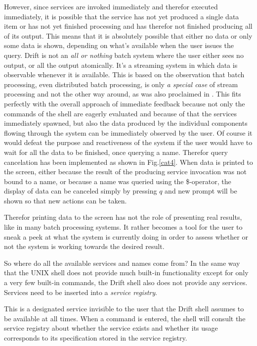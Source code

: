 However, since services are invoked immediately and therefor executed
immediately, it is possible that the service has not yet produced
a single data item or has not yet finished processing and has
therefor not finished producing all of its output. This means that
it is absolutely possible that either no data or only some data is
shown, depending on what's available when the user issues the query.
\newline
Drift is not an \textit{all or nothing} batch system where the user
either sees no output, or all the output atomically. It's a streaming
system in which data is observable whenever it is available. This is
based on the observation that batch processing, even distributed
batch processing, is only \textit{a special case} of stream processing
and not the other way around, as was also proclaimed in
\cite[chapter 1]{flink}. This fits perfectly with the overall
approach of immediate feedback because not only the commands of
the shell are eagerly evaluated and because of that the services
immediately spawned, but also the data produced by the individual
components flowing through the system can be immediately observed
by the user.
\newline
Of course it would defeat the purpose and reactiveness of the system
if the user would have to wait for all the data to be finished, once
querying a name. Therefor query cancelation has been implemented as
shown in Fig.\ref{cat4}. When data is printed to the screen, either
because the result of the producing service invocation was not bound
to a name, or because a name was queried using the \$-operator, the
display of data can be canceled simply by pressing $q$ and new prompt
will be shown so that new actions can be taken.

Therefor printing data to the screen has not the role of presenting
real results, like in many batch processing systems. It rather becomes
a tool for the user to sneak a peek at what the system is currently
doing in order to assess whether or not the system is working
towards the desired result.
\newline

So where do all the available services and names come from?
In the same way that the UNIX shell does not provide much
built-in functionality except for only a very few built-in
commands, the Drift shell also does not provide any services.
Services need to be inserted into a \textit{service registry}.

This is a designated service invisible to the user that the
Drift shell assumes to be available at all times. When a command
is entered, the shell will consult the service registry about
whether the service exists and whether its usage corresponds to
its specification stored in the service registry.

